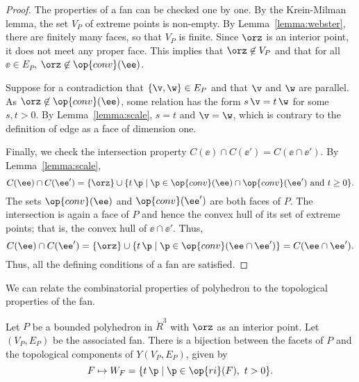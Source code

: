 \begin{proof} The properties of a fan can be checked one by one.  By
the Krein-Milman lemma, the set $V_P$ of extreme points is non-empty.  By
Lemma~\ref{lemma:webster}, there are finitely many faces, so that
$V_P$ is finite.  Since $\orz$ is an interior point, it does not
meet any proper face.  This implies that $\orz\not\in V_P$ and that
for all $\ee\in E_P$, $\orz\not\in \op{conv}(\ee)$.

Suppose for a contradiction that $\{\v,\w\}\in E_P$ and that $\v$
and $\w$ are parallel.  As $\orz\not\in \op{conv}(\ee)$, some
relation has the form $s\, \v = t\, \w$ for some $s, t>0$.  By
Lemma~\ref{lemma:scale}, $s=t$ and $\v=\w$, which is contrary to the
definition of edge as a face of dimension one.

Finally, we check the intersection property $C(\ee)\cap C(\ee') = C(\ee \cap
\ee')$.  By Lemma~\ref{lemma:scale},
\begin{displaymath}
C(\ee) \cap C(\ee') =
 \{\orz\}\cup \{t\, \p \mid \p\in \op{conv}(\ee) \cap \op{conv}(\ee') 
\text{ and } t \ge 0\}.
\end{displaymath}
The sets $\op{conv}(\ee)$ and $\op{conv}(\ee')$ are both faces of $P$.  The
intersection is again a face of $P$ and hence the convex
hull of its set of extreme points; that is, the convex hull of $\ee \cap \ee'$.
Thus,
\begin{displaymath}
C(\ee)\cap C(\ee') = \{\orz\}\cup \{t\, \p \mid \p\in 
\op{conv}(\ee\cap \ee')\} = C(\ee \cap \ee').
\end{displaymath}
Thus, all the defining conditions of a fan are satisfied.
\end{proof}

We can relate the combinatorial properties of polyhedron to the topological
properties of the fan.

\begin{lemma}[]\label{lemma:WF} 
Let $P$ be a bounded polyhedron in $\ring{R}^3$ with $\orz$ as an
interior point.  Let $(V_P,E_P)$ be the associated fan.  There is a
bijection between the facets of $P$ and the topological components
of $Y(V_P,E_P)$, given by
\begin{displaymath}
F \mapsto W_F = \{t\, \p \mid \p\in \op{ri}(F),~t >0\}.
\end{displaymath}
\end{lemma}
%

